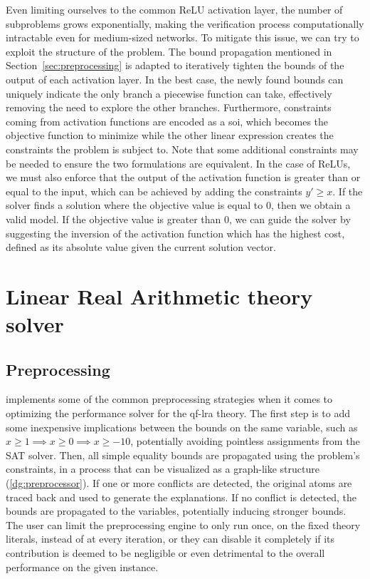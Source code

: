 \documentclass[runningheads]{llncs}
\begin{document}
Even limiting ourselves to the common ReLU activation layer, the number of subproblems grows exponentially, making the verification process computationally intractable even for medium-sized networks.
To mitigate this issue, we can try to exploit the structure of the problem.
The bound propagation mentioned in Section~\ref{sec:preprocessing} is adapted to iteratively tighten the bounds of the output of each activation layer.
In the best case, the newly found bounds can uniquely indicate the only branch a piecewise function can take, effectively removing the need to explore the other branches.
Furthermore, constraints coming from activation functions are encoded as a \gls{soi}, which becomes the objective function to minimize while the other linear expression creates the constraints the problem is subject to.
Note that some additional constraints may be needed to ensure the two formulations are equivalent.
In the case of ReLUs, we must also enforce that the output of the activation function is greater than or equal to the input, which can be achieved by adding the constraints $y' \ge x$.
If the solver finds a solution where the objective value is equal to $0$, then we obtain a valid model.
If the objective value is greater than $0$, we can guide the solver by suggesting the inversion of the activation function which has the highest cost, defined as its absolute value given the current solution vector.

\section{Linear Real Arithmetic theory solver}
\label{sec:lra-theory-solver}

\subsection*{Preprocessing}
\label{sec:preprocessing}

\dlinear implements some of the common preprocessing strategies when it comes to optimizing the performance solver for the \gls{qf-lra} theory.
The first step is to add some inexpensive implications between the bounds on the same variable, such as $x \ge 1 \implies x \ge 0 \implies x \ge -10$, potentially avoiding pointless assignments from the SAT solver.
Then, all simple equality bounds are propagated using the problem's constraints, in a process that can be visualized as a graph-like structure (\autoref{dg:preprocessor}).
If one or more conflicts are detected, the original atoms are traced back and used to generate the explanations.
If no conflict is detected, the bounds are propagated to the variables, potentially inducing stronger bounds.
The user can limit the preprocessing engine to only run once, on the fixed theory literals, instead of at every iteration, or they can disable it completely if its contribution is deemed to be negligible or even detrimental to the overall performance on the given instance.
\end{document}
